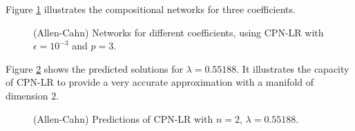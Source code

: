 Figure \ref{fig:allen_cahn_graphs} illustrates the compositional networks for three coefficients. 

\begin{figure}[h]
    \centering
    \caption{(Allen-Cahn) Networks for different coefficients, using CPN-LR with $\epsilon=10^{-3}$ and $p=3$.}
    \label{fig:allen_cahn_graphs}
\end{figure}


Figure \ref{fig:allen_cahn_viz_solution} shows the predicted solutions for $\lambda = 0.55188$. It illustrates the capacity of CPN-LR to provide a very accurate approximation  with a manifold of dimension $2$. 

 \begin{figure}[H]
    \centering
    \caption{(Allen-Cahn) Predictions of CPN-LR with $n=2$, $\lambda = 0.55188$.}
    \label{fig:allen_cahn_viz_solution}
\end{figure}


